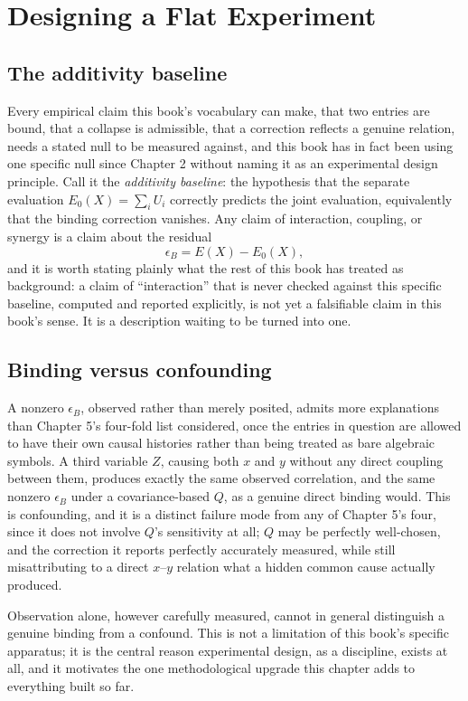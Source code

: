 \documentclass[11pt]{book}
\begin{document}
\chapter{Designing a Flat Experiment}

\section{The additivity baseline}

Every empirical claim this book's vocabulary can make, that two entries are bound, that a collapse is admissible, that a correction reflects a genuine relation, needs a stated null to be measured against, and this book has in fact been using one specific null since Chapter 2 without naming it as an experimental design principle. Call it the \emph{additivity baseline}: the hypothesis that the separate evaluation $E_0(X)=\sum_iU_i$ correctly predicts the joint evaluation, equivalently that the binding correction vanishes. Any claim of interaction, coupling, or synergy is a claim about the residual
\[
\epsilon_B = E(X) - E_0(X),
\]
and it is worth stating plainly what the rest of this book has treated as background: a claim of ``interaction'' that is never checked against this specific baseline, computed and reported explicitly, is not yet a falsifiable claim in this book's sense. It is a description waiting to be turned into one.

\section{Binding versus confounding}

A nonzero $\epsilon_B$, observed rather than merely posited, admits more explanations than Chapter 5's four-fold list considered, once the entries in question are allowed to have their own causal histories rather than being treated as bare algebraic symbols. A third variable $Z$, causing both $x$ and $y$ without any direct coupling between them, produces exactly the same observed correlation, and the same nonzero $\epsilon_B$ under a covariance-based $Q$, as a genuine direct binding would. This is confounding, and it is a distinct failure mode from any of Chapter 5's four, since it does not involve $Q$'s sensitivity at all; $Q$ may be perfectly well-chosen, and the correction it reports perfectly accurately measured, while still misattributing to a direct $x$--$y$ relation what a hidden common cause actually produced.

Observation alone, however carefully measured, cannot in general distinguish a genuine binding from a confound. This is not a limitation of this book's specific apparatus; it is the central reason experimental design, as a discipline, exists at all, and it motivates the one methodological upgrade this chapter adds to everything built so far.
\end{document}
